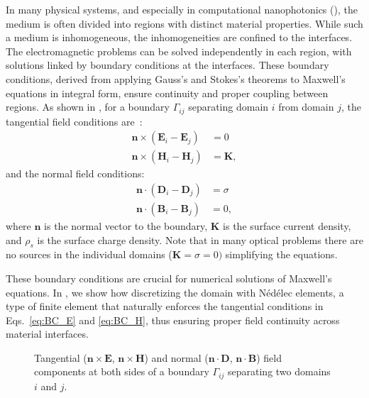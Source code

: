    In many physical systems, and especially in computational nanophotonics
    (), the medium is often divided into regions with distinct
    material properties. While such a medium is inhomogeneous, the inhomogeneities
    are confined to the interfaces. The electromagnetic problems can be solved
    independently in each region, with solutions linked by boundary conditions at
    the interfaces. These boundary conditions, derived from applying Gauss's and
    Stokes's theorems to Maxwell's equations in integral form, ensure continuity
    and proper coupling between regions.
    As shown in , for a boundary $\Gamma_{ij}$ separating domain
$i$ from domain $j$, the tangential field conditions are~\cite{novotny}:
    \begin{align}
        \mathbf{n} \times (\mathbf{E}_i - \mathbf{E}_j) & = 0 \label{eq:BC_E} \\
        \mathbf{n} \times (\mathbf{H}_i - \mathbf{H}_j) & = \mathbf{K} ,
        \label{eq:BC_H}
    \end{align}
    and the normal field conditions:
    \begin{align}
        \mathbf{n} \cdot (\mathbf{D}_i - \mathbf{D}_j) & = \sigma \label{eq:BC_D} \\
        \mathbf{n} \cdot (\mathbf{B}_i - \mathbf{B}_j) & = 0, \label{eq:BC_B}
    \end{align}
    where $\mathbf{n}$ is the normal vector to the boundary, $\mathbf{K}$ is the
    surface current density,
    and $\rho_s$ is the surface charge density. Note that in many optical problems
    there are no
    sources in the individual domains ($\mathbf{K}=\sigma=0)$ simplifying the
    equations.

    These boundary conditions are crucial for numerical solutions of Maxwell's
    equations. In , we show how discretizing the domain with
    Nédélec elements,
    a type of finite element that naturally enforces the tangential conditions in
    Eqs.~\eqref{eq:BC_E} and \eqref{eq:BC_H}, thus ensuring
    proper field continuity across material interfaces.

    \begin{figure}[tb]
        \centering

        \caption{Tangential ($\mathbf{n}\times \mathbf{E}$, $\mathbf{n}\times
                \mathbf{H}$) and normal ($\mathbf{n}\cdot\mathbf{D}$,
            $\mathbf{n}\cdot\mathbf{B}$) field components at both sides of a boundary
            $\Gamma_{ij}$ separating two domains $i$ and $j$.}
        \label{fig:bcs}
    \end{figure}

